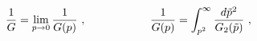 \begin{equation}\label{1.21}
{1 \over G}=\lim_{p \rightarrow 0}{1 \over G(p)}~,\hskip 2cm
{1 \over G(p)}=\int_{p^2}^\infty {d{\tilde p}^2 \over G_2({\tilde p})}~,
\end{equation}

